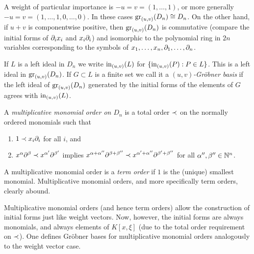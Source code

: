 A weight of particular importance is $-u=v=(1,\ldots,1)$, or more
generally $-u=v=(1,\ldots,1,0,\ldots,0)$. In these cases
$\operatorname{gr}_{(u,v)}(D_n)\cong D_n$. On the other hand, if $u+v$ is
componentwise positive, then $\operatorname{gr}_{(u,v)}(D_n)$ is commutative
(compare the initial forms of $\partial_ix_i$ and $x_i\partial_i$) and
isomorphic to the polynomial ring in $2n$ variables corresponding to
the symbols of $x_1,\ldots,x_n,\partial_1,\ldots,\partial_n$. 


If $L$ is a left ideal in $D_n$ 
we write $\operatorname{in}_{(u,v)}(L)$
 for $\{\operatorname{in}_{(u,v)}(P):P\in L\}$. This is a
left ideal in $\operatorname{gr}_{(u,v)}(D_n)$. If $G\subset L$ is a finite set we
call it a {\em $(u,v)$-Gr\"obner basis}
 if the left ideal of
$\operatorname{gr}_{(u,v)}(D_n)$ generated by the initial forms of the elements of
$G$ agrees with $\operatorname{in}_{(u,v)}(L)$.

A {\em multiplicative monomial order on $D_n$} 
is a total order $\prec$
on the normally ordered monomials such that 
\begin{enumerate}
\item $1\prec x_i\partial_i$ for all $i$, and
\item $x^\alpha\partial^\beta\prec x^{\alpha'}\partial^{\beta'}$ implies 
$x^{\alpha+\alpha''}\partial^{\beta+\beta''}\prec
x^{\alpha'+\alpha''}\partial^{\beta'+\beta''}$ for all
$\alpha'',\beta''\in {\mathbb N}^n$. 
\end{enumerate}
A multiplicative monomial order is a {\em
term order}
 if $1$ is the (unique) smallest monomial. 
Multiplicative monomial orders, and more specifically term orders,
clearly abound.

Multiplicative monomial orders (and hence term orders) allow the
construction of initial forms just like weight vectors. Now, however, the
initial forms are always monomials, and always elements of $K[x,\xi]$
(due to the total order requirement on $\prec$). One
defines Gr\"obner bases for multiplicative monomial orders analogously
to the weight vector case.

